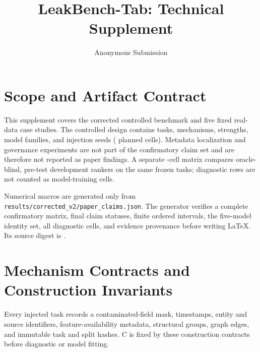 \documentclass[letterpaper]{article}
\title{LeakBench-Tab: Technical Supplement}
\author{Anonymous Submission}
\begin{document}
\maketitle

\ifLBResultsReady\else
\begin{center}
\end{center}
\fi

\section{Scope and Artifact Contract}
This supplement covers the corrected controlled benchmark and five fixed
real-data case studies.  The controlled design contains
\LBControlledTaskCount{} tasks, \LBMechanismCount{} mechanisms,
\LBStrengthCount{} strengths, \LBCoreModelCount{} model families, and
\LBSeedCount{} injection seeds (\LBExpectedCells{} planned cells).  Metadata
localization and governance experiments are not part of the confirmatory claim
set and are therefore not reported as paper findings.  A separate
\LBExpectedDiagnosticCells{}-cell matrix compares
\LBDiagnosticMethodCount{} oracle-blind, pre-test development rankers on the
same frozen tasks; diagnostic rows are not counted as model-training cells.

Numerical macros are generated only from
\texttt{results/corrected\_v2/paper\_claims.json}.  The generator verifies a
complete confirmatory matrix, final claim statuses, finite ordered intervals,
the five-model identity set, all \LBExpectedDiagnosticCells{} diagnostic cells,
and evidence provenance before writing LaTeX.  Its source digest is
\texttt{\LBSourceSHA}.

\section{Mechanism Contracts and Construction Invariants}
Every injected task records a contaminated-field mask, timestamps, entity and
source identifiers, feature-availability metadata, structural groups, graph
edges, and immutable task and split hashes.  C is fixed by these construction
contracts before diagnostic or model fitting.
\end{document}
